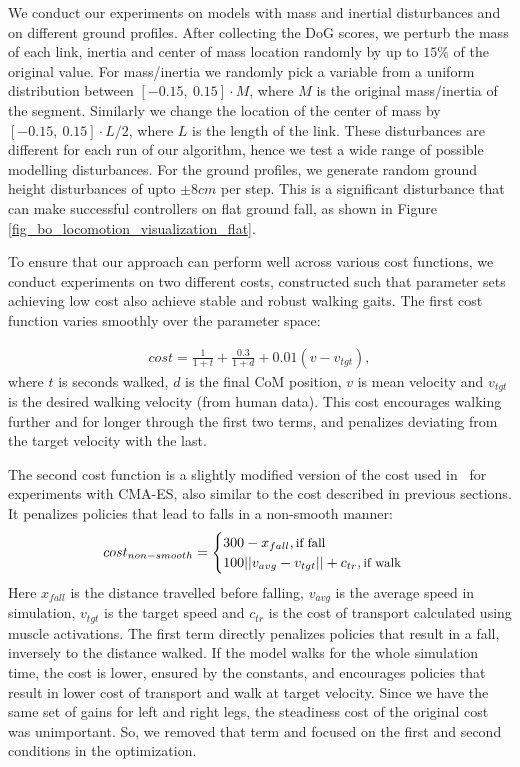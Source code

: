 We conduct our experiments on models with mass and inertial disturbances and on different ground profiles. After collecting the DoG scores, we perturb the mass of each link, inertia and center of mass location randomly by up to $15\%$ of the original value. For mass/inertia we randomly pick a variable from a uniform distribution between $[-0.15,\ 0.15] \cdot M$, where $M$ is the original mass/inertia of the segment. Similarly we change the location of the center of mass by $[-0.15,\ 0.15] \cdot L/2$, where $L$ is the length of the link. These disturbances are different for each run of our algorithm, hence we test a wide range of possible modelling disturbances.
For the ground profiles, we generate random ground height disturbances of upto $\pm 8cm$ per step. This is a significant disturbance that can make successful controllers on flat ground fall, as shown in Figure \ref{fig_bo_locomotion_visualization_flat}.

To ensure that our approach can perform well across various cost functions, we conduct experiments on two different costs, constructed such that parameter sets achieving low cost also achieve stable and robust walking gaits. The first cost function varies smoothly over the parameter space:
 
\begin{align}
cost = \frac{1}{1+t} + \frac{0.3}{1+d} + 0.01 (v-v_{tgt}),
\end{align}
where $t$ is seconds walked, $d$ is the final CoM position, $v$ is mean velocity and $v_{tgt}$ is the desired walking velocity (from human data). This cost encourages walking further and for longer through the first two terms, and penalizes deviating from the target velocity with the last.

The second cost function is a slightly modified version of the cost used in~\cite{song2015neural} for experiments with \mbox{CMA-ES}, also similar to the cost described in previous sections. It penalizes policies that lead to falls in a non-smooth manner:
\begin{align}
cost_{non-smooth} = 		
    \begin{cases}
		300 - x_{fall} , \text{\small{if fall}} \\
		100 ||v_{avg} - v_{tgt}|| + c_{tr}, \text{\small{if walk}}\\
	\end{cases}
\end{align}
Here $x_{fall}$ is the distance travelled before falling, $v_{avg}$ is the average speed in simulation, $v_{tgt}$ is the target speed and $c_{tr}$ is the cost of transport calculated using muscle activations. The first term directly penalizes policies that result in a fall, inversely to the distance walked. If the model walks for the whole simulation time, the cost is lower, ensured by the constants, and encourages policies that result in lower cost of transport and walk at target velocity. Since we have the same set of gains for left and right legs, the steadiness cost of the original cost~\cite{song2015neural} was unimportant. So, we removed that term and focused on the first and second conditions in the optimization.

